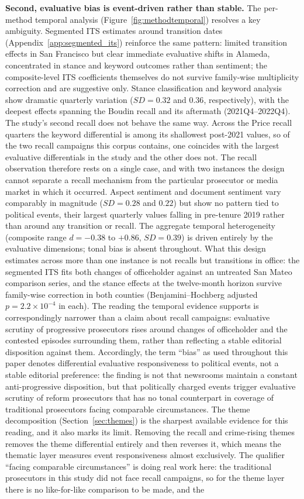 \documentclass[12pt, letterpaper]{article}
\begin{document}
\textbf{Second, evaluative bias is event-driven rather than stable.} The per-method temporal analysis (Figure~\ref{fig:methodtemporal}) resolves a key ambiguity. Segmented ITS estimates around transition dates (Appendix~\ref{app:segmented_its}) reinforce the same pattern: limited transition effects in San Francisco but clear immediate evaluative shifts in Alameda, concentrated in stance and keyword outcomes rather than sentiment; the composite-level ITS coefficients themselves do not survive family-wise multiplicity correction and are suggestive only. Stance classification and keyword analysis show dramatic quarterly variation ($SD = 0.32$ and $0.36$, respectively), with the deepest effects spanning the Boudin recall and its aftermath (2021Q4--2022Q4). The study's second recall does not behave the same way. Across the Price recall quarters the keyword differential is among its shallowest post-2021 values, so of the two recall campaigns this corpus contains, one coincides with the largest evaluative differentials in the study and the other does not. The recall observation therefore rests on a single case, and with two instances the design cannot separate a recall mechanism from the particular prosecutor or media market in which it occurred. Aspect sentiment and document sentiment vary comparably in magnitude ($SD = 0.28$ and $0.22$) but show no pattern tied to political events, their largest quarterly values falling in pre-tenure 2019 rather than around any transition or recall. The aggregate temporal heterogeneity (composite range $d = -0.38$ to $+0.86$, $SD = 0.39$) is driven entirely by the evaluative dimensions; tonal bias is absent throughout. What this design estimates across more than one instance is not recalls but transitions in office: the segmented ITS fits both changes of officeholder against an untreated San Mateo comparison series, and the stance effects at the twelve-month horizon survive family-wise correction in both counties (Benjamini--Hochberg adjusted $p = 2.2 \times 10^{-4}$ in each). The reading the temporal evidence supports is correspondingly narrower than a claim about recall campaigns: evaluative scrutiny of progressive prosecutors rises around changes of officeholder and the contested episodes surrounding them, rather than reflecting a stable editorial disposition against them. Accordingly, the term ``bias'' as used throughout this paper denotes differential evaluative responsiveness to political events, not a stable editorial preference: the finding is not that newsrooms maintain a constant anti-progressive disposition, but that politically charged events trigger evaluative scrutiny of reform prosecutors that has no tonal counterpart in coverage of traditional prosecutors facing comparable circumstances. The theme decomposition (Section~\ref{sec:themes}) is the sharpest available evidence for this reading, and it also marks its limit. Removing the recall and crime-rising themes removes the theme differential entirely and then reverses it, which means the thematic layer measures event responsiveness almost exclusively. The qualifier ``facing comparable circumstances'' is doing real work here: the traditional prosecutors in this study did not face recall campaigns, so for the theme layer there is no like-for-like comparison to be made, and the 
\end{document}

